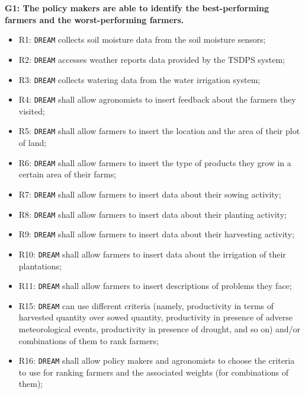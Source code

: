 \documentclass{article}
\begin{document}
\vspace{1cm}
\newline
\textbf{G1: The policy makers are able to identify the best-performing farmers and the worst-performing farmers.}
\begin{itemize}
    \item R1: \verb|DREAM| collects soil moisture data from the soil moisture sensors;
    \item R2: \verb|DREAM| accesses weather reports data provided by the TSDPS system;

    \item R3: \verb|DREAM| collects watering data from the water irrigation system;

    \item R4: \verb|DREAM| shall allow agronomists to insert feedback about the farmers they visited;

    \item R5: \verb|DREAM| shall allow farmers to insert the location and the area of their plot of land;

    \item R6: \verb|DREAM| shall allow farmers to insert the type of products they grow in a certain area of their farms;

    \item R7: \verb|DREAM| shall allow farmers to insert data about their sowing activity;

    \item R8: \verb|DREAM| shall allow farmers to insert data about their planting activity;
    
    \item R9: \verb|DREAM| shall allow farmers to insert data about their harvesting activity;
    
    \item R10: \verb|DREAM| shall allow farmers to insert data about the irrigation of their plantations;
    
    \item R11: \verb|DREAM| shall allow farmers to insert descriptions of problems they face;
    
    \item R15: \verb|DREAM| can use different criteria (namely, productivity in terms of harvested quantity over sowed quantity, productivity in presence of adverse meteorological events, productivity in presence of drought, and so on) and/or combinations of them to rank farmers;
    
    \item R16: \verb|DREAM| shall allow policy makers and agronomists to choose the criteria to use for ranking farmers and the associated weights (for combinations of them);
    

\end{itemize}
\end{document}

